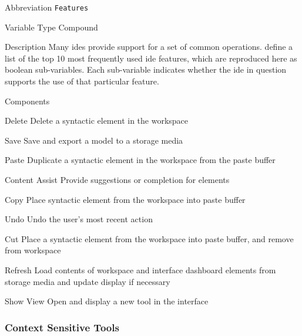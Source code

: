 \begin{AlignedDesc}
  \item[Abbreviation] \texttt{Features}

  \item[Variable Type] Compound

  \item[Description] Many \acp{ide} provide support for a set of common
  operations. \citeauthor{murphy2006} define a list of the top 10 most
  frequently used \ac{ide} features, which are reproduced here as boolean
  sub-variables. \cite{murphy2006} Each sub-variable indicates whether the
  \ac{ide} in question supports the use of that particular feature.

  \item[Components]

  \begin{AlignedDesc}
    \item[Delete] Delete a syntactic element in the workspace
    \item[Save] Save and export a model to a storage media
    \item[Paste] Duplicate a syntactic element in the workspace from the
    paste buffer
    \item[Content Assist] Provide suggestions or completion for elements
    \item[Copy] Place syntactic element from the workspace into paste
    buffer
    \item[Undo] Undo the user's most recent action
    \item[Cut] Place a syntactic element from the workspace into paste
    buffer, and remove from workspace
    \item[Refresh] Load contents of workspace and interface dashboard
    elements from storage media and update display if necessary
    \item[Show View] Open and display a new tool in the interface
  \end{AlignedDesc}

\end{AlignedDesc}

\subsubsection{Context Sensitive Tools}
\label{subsec:context}

